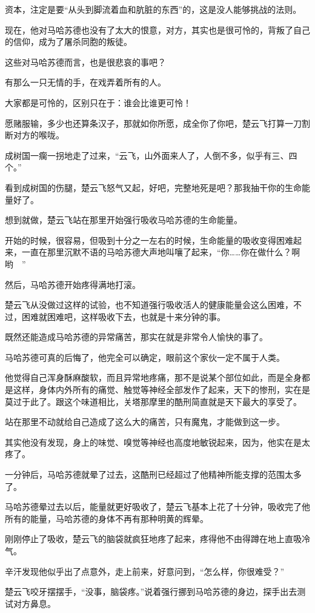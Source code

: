 资本，注定是要“从头到脚流着血和肮脏的东西”的，这是没人能够挑战的法则。

现在，他对马哈苏德也没有了太大的恨意，对方，其实也是很可怜的，背叛了自己的信仰，成为了屠杀同胞的叛徒。

这些对马哈苏德而言，也是很悲哀的事吧？

有那么一只无情的手，在戏弄着所有的人。

大家都是可怜的，区别只在于：谁会比谁更可怜！

愿赌服输，多少也还算条汉子，那就如你所愿，成全你了你吧，楚云飞打算一刀割断对方的喉咙。

成树国一瘸一拐地走了过来，“云飞，山外面来人了，人倒不多，似乎有三、四个。”

看到成树国的伤腿，楚云飞怒气又起，好吧，完整地死是吧？那我抽干你的生命能量好了。

想到就做，楚云飞站在那里开始强行吸收马哈苏德的生命能量。

开始的时候，很容易，但吸到十分之一左右的时候，生命能量的吸收变得困难起来，一直在那里沉默不语的马哈苏德大声地叫嚷了起来，“你……你在做什么？啊哟~~”

然后，马哈苏德开始疼得满地打滚。

楚云飞从没做过这样的试验，也不知道强行吸收活人的健康能量会这么困难，不过，困难就困难吧，这样吸收下去，也就是十来分钟的事。

既然还能造成马哈苏德的异常痛苦，那实在就是非常令人愉快的事了。

马哈苏德可真的后悔了，他完全可以确定，眼前这个家伙一定不属于人类。

他觉得自己浑身酥麻酸软，而且异常地疼痛，那不是说某个部位如此，而是全身都是这样，身体内外所有的痛觉、触觉等神经全部发作了起来，天下的惨刑，实在是莫过于此了。跟这个味道相比，关塔那摩里的酷刑简直就是天下最大的享受了。

站在那里不动就给自己造成了这么大的痛苦，只有魔鬼，才能做到这一步。

其实他没有发现，身上的味觉、嗅觉等神经也高度地敏锐起来，因为，他实在是太疼了。

一分钟后，马哈苏德就晕了过去，这酷刑已经超过了他精神所能支撑的范围太多了。

马哈苏德晕过去以后，能量就更好吸收了，楚云飞基本上花了十分钟，吸收完了他所有的能量，马哈苏德的身体不再有那种明黄的辉晕。

刚刚停止了吸收，楚云飞的脑袋就疯狂地疼了起来，疼得他不由得蹲在地上直吸冷气。

辛汗发现他似乎出了点意外，走上前来，好意问到，“怎么样，你很难受？”

楚云飞咬牙摆摆手，“没事，脑袋疼。”说着强行挪到马哈苏德的身边，探手出去测试对方鼻息。

